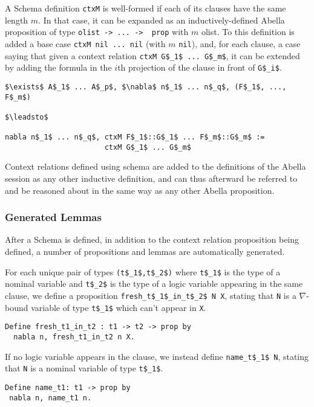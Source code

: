 \documentclass[nocopyrightspace,authoryear]{sigplanconf}
\begin{document}
A Schema definition \lstinline|ctxM| is well-formed if each of its clauses have the same length $m$. In that case, it can be expanded as an inductively-defined Abella proposition of type \lstinline|olist -> ... ->  prop| with $m$ olist. To this definition is added a base case \lstinline|ctxM nil ... nil| (with $m$ \lstinline|nil|), and, for each clause, a case saying that given a context relation \lstinline|ctxM G$_1$ ... G$_m$|, it can be extended by adding the formula in the $i$th projection of the clause in front of \lstinline|G$_i$|.
\begin{lstlisting}
$\exists$ A$_1$ ... A$_p$, $\nabla$ n$_1$ ... n$_q$, (F$_1$, ..., F$_m$)

$\leadsto$

nabla n$_1$ ... n$_q$, ctxM F$_1$::G$_1$ ... F$_m$::G$_m$ := 
                       ctxM G$_1$ ... G$_m$
\end{lstlisting}

Context relations defined using schema are added to the definitions of the Abella session as any other inductive definition, and can thus afterward be referred to and be reasoned about in the same way as any other Abella proposition.

\subsubsection{Generated Lemmas}

After a Schema is defined, in addition to the context relation proposition being defined, a number of propositions and lemmas are automatically generated.

For each unique pair of types \lstinline|(t$_1$,t$_2$)| where \lstinline|t$_1$| is the type of a nominal variable and \lstinline|t$_2$| is the type of a logic variable appearing in the same clause, we define a proposition \lstinline|fresh_t$_1$_in_t$_2$ N X|, stating that \lstinline|N| is a $\nabla$-bound variable of type \lstinline|t$_1$| which can't appear in \lstinline|X|.

\begin{lstlisting}
Define fresh_t1_in_t2 : t1 -> t2 -> prop by
  nabla n, fresh_t1_in_t2 n X.
\end{lstlisting}

If no logic variable appears in the clause, we instead define \lstinline|name_t$_1$ N|, stating that \lstinline|N| is a nominal variable of type \lstinline|t$_1$|.

\begin{lstlisting}
Define name_t1: t1 -> prop by
 nabla n, name_t1 n.
\end{lstlisting}
\end{document}
